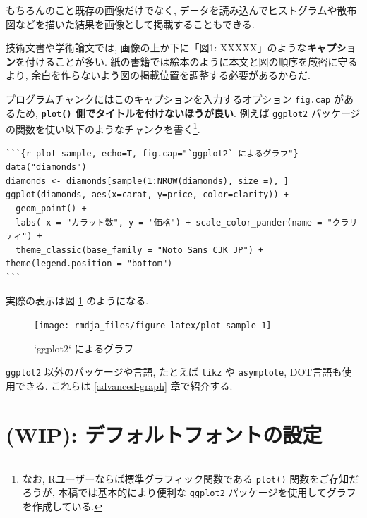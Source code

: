 \documentclass[
]{bxjsbook}
\theoremstyle{definition}
\theoremstyle{definition}
\theoremstyle{definition}
\theoremstyle{remark}
\begin{document}
もちろんのこと既存の画像だけでなく,
データを読み込んでヒストグラムや散布図などを描いた結果を画像として掲載することもできる.

技術文書や学術論文では, 画像の上か下に「図1:
XXXXX」のような\textbf{キャプション}を付けることが多い.
紙の書籍では絵本のように本文と図の順序を厳密に守るより,
余白を作らないよう図の掲載位置を調整する必要があるからだ.

プログラムチャンクにはこのキャプションを入力するオプション
\texttt{fig.cap} があるため, \textbf{\texttt{plot()}
側でタイトルを付けないほうが良い}. 例えば \texttt{ggplot2}
パッケージの関数を使い以下のようなチャンクを書く\footnote{なお,
  Rユーザーならば標準グラフィック関数である \texttt{plot()}
  関数をご存知だろうが, 本稿では基本的により便利な \texttt{ggplot2}
  パッケージを使用してグラフを作成している.}.

\begin{verbatim}
```{r plot-sample, echo=T, fig.cap="`ggplot2` によるグラフ"}
data("diamonds")
diamonds <- diamonds[sample(1:NROW(diamonds), size =), ]
ggplot(diamonds, aes(x=carat, y=price, color=clarity)) +
  geom_point() +
  labs( x = "カラット数", y = "価格") + scale_color_pander(name = "クラリティ") +
  theme_classic(base_family = "Noto Sans CJK JP") + theme(legend.position = "bottom")
```
\end{verbatim}

実際の表示は図 \ref{fig:plot-sample} のようになる.

\begin{figure}

{\centering \texttt{[image: rmdja\_files/figure-latex/plot-sample-1]} 

}

\caption{`ggplot2` によるグラフ}\label{fig:plot-sample}
\end{figure}

\texttt{ggplot2} 以外のパッケージや言語, たとえば \texttt{tikz} や
\texttt{asymptote}, DOT言語も使用できる. これらは \ref{advanced-graph}
章で紹介する.

\hypertarget{wip-ux30c7ux30d5ux30a9ux30ebux30c8ux30d5ux30a9ux30f3ux30c8ux306eux8a2dux5b9a}{%
\section{(WIP):
デフォルトフォントの設定}\label{wip-ux30c7ux30d5ux30a9ux30ebux30c8ux30d5ux30a9ux30f3ux30c8ux306eux8a2dux5b9a}}
\end{document}
